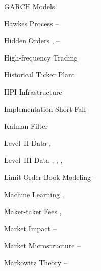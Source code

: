 \begin{multicols}{2}
{GARCH Models \hfill \pageref{in:garch_model} \pspace





Hawkes Process \hfill \pageref{in:hawk1}--\pageref{in:hawk2} \par

Hidden Orders \hfill \pageref{in:hidden1}, \pageref{in:hidden2}--\pageref{in:hidden3} \par

High-frequency Trading \hfill \pageref{in:higheff} \par

Historical Ticker Plant \hfill \pageref{in:hist_tick_plant} \par

HPI Infrastructure \hfill \pageref{in:hpi} \pspace





Implementation Short-Fall \hfill \pageref{in:shortfall} \pspace





Kalman Filter \hfill \pageref{in:kalman} \pspace





Level~II Data \hfill \pageref{in:level2dat1}, \pageref{in:level2dat2} \par

Level~III Data \hfill \pageref{in:level3dat1}, \pageref{in:level3dat2}, \pageref{in:level3dat3}, \pageref{in:level3dat4} \par

Limit Order Book Modeling \hfill \pageref{in:labmod1}--\pageref{in:labmod2} \pspace



 

Machine Learning \hfill \pageref{in:machine1}, \pageref{in:machine2} \par

Maker-taker Fees \hfill \pageref{in:takerfee1}, \pageref{in:takerfee2} \par

Market Impact \hfill \pageref{in:impact1}--\pageref{in:impact2} \par

Market Microstructure \hfill \pageref{in:micro1}--\pageref{in:micro2} \par

Markowitz Theory \hfill \pageref{in:mark1}--\pageref{in:mark2} \par

}
\end{multicols}
